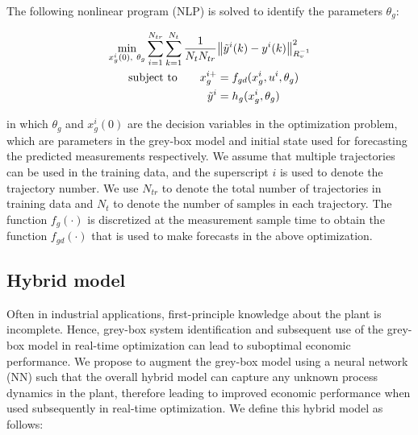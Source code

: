 \documentclass[10pt]{article}
\begin{document}
The following nonlinear program (NLP) is solved to identify the parameters
$\theta_g$:

\begin{align} \label{eq:gb_training}
  \underset{x_g^i(0), \ \theta_g}{\textnormal{min}} \sum_{i=1}^{N_{tr}} \sum_{k=1}^{N_t} 
  \dfrac{1}{N_tN_{tr}} &\norm{\tilde{y}^i(k) - y^i(k)}^2_{R_v^{-1}}  \\
  \textnormal{subject to} \quad \quad x_g^{i+} &= f_{gd}(x_g^i, u^i, \theta_g) \nonumber \\
   \tilde{y}^i &= h_g(x_g^i, \theta_g) \nonumber
\end{align}

in which $\theta_g$ and $x_g^i(0)$ are the decision variables in the
optimization problem, which are parameters in the grey-box model and initial
state used for forecasting the predicted measurements respectively. We assume
that multiple trajectories can be used in the training data, and the superscript
$i$ is used to denote the trajectory number. We use $N_{tr}$ to denote the total
number of trajectories in training data and $N_t$ to denote the number of
samples in each trajectory. The function $f_{g}(\cdot)$ is discretized at the
measurement sample time to obtain the function $f_{gd}(\cdot)$ that is used to
make forecasts in the above optimization.

\subsection{Hybrid model}

Often in industrial applications, first-principle knowledge about the plant is
incomplete. Hence, grey-box system identification and subsequent use of the
grey-box model in real-time optimization can lead to suboptimal economic
performance. We propose to augment the grey-box model using a neural network
(NN) such that the overall hybrid model can capture any unknown process dynamics
in the plant, therefore leading to improved economic performance when used
subsequently in real-time optimization. We define this hybrid model as follows:
\end{document}
